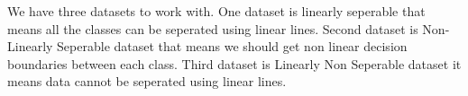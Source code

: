 We have three datasets to work with. One dataset is linearly seperable that means all the classes can be seperated using linear lines. Second dataset is Non-Linearly Seperable dataset that means we should get non linear decision boundaries between each class. Third dataset is Linearly Non Seperable dataset it means data cannot be seperated using linear lines.